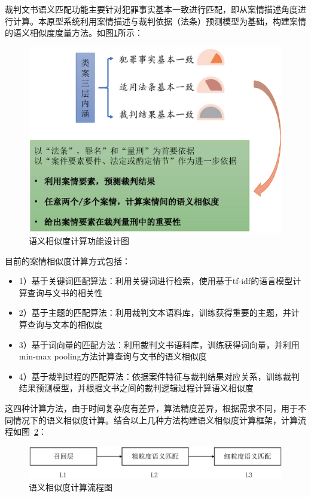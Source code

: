 裁判文书语义匹配功能主要针对犯罪事实基本一致进行匹配，即从案情描述角度进行计算。本原型系统利用案情描述与裁判依据（法条）预测模型为基础，构建案情的语义相似度度量方法。如图\ref{fig:sys_similarity}所示：
\begin{figure}[htbp]%
    \centering
    \includegraphics[scale=0.5, clip=true]{./sources/sys_similarity.eps}
    \caption{\label{fig:sys_similarity}语义相似度计算功能设计图}
\end{figure}

目前的案情相似度计算方式包括：
\begin{itemize}
    \item 1）基于关键词匹配算法：利用关键词进行检索，使用基于tf-idf的语言模型计算查询与文书的相关性
    \item 2）基于主题的匹配算法：利用裁判文本语料库，训练获得重要的主题，并计算查询与文本的相似度
    \item 3）基于词向量的匹配方法：利用裁判文书语料库，训练获得词向量，并利用min-max pooling方法计算查询与文书的语义相似度
    \item 4）基于裁判过程的匹配算法：依据案件特征与裁判结果对应关系，训练裁判结果预测模型，并根据文书之间的裁判逻辑过程计算语义相似度
\end{itemize}

这四种计算方法，由于时间复杂度有差异，算法精度差异，根据需求不同，用于不同情况下的语义相似度计算。结合以上几种方法构建语义相似度计算框架，计算流程如图~\ref{fig:sys_similarity2}：
\begin{figure}[htbp]%
    \centering
    \includegraphics[scale=0.5, clip=true]{./sources/sys_similarity2.eps}
    \caption{\label{fig:sys_similarity2}语义相似度计算流程图}
\end{figure}

